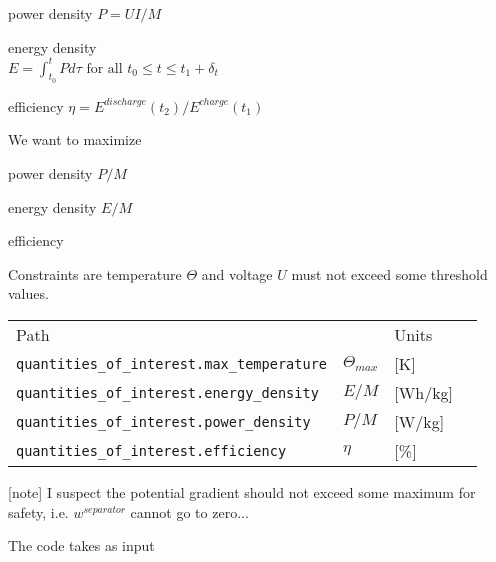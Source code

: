 \documentclass[10pt, oneside]{article}   	%
\begin{document}
power density $P=UI/M$

energy density \\
$E=\int_{t_0}^{t} P d\tau \text{\ for\ all\ } t_0 \leq t \leq t_1+\delta_t$



efficiency $\eta=E^{discharge}(t_2)/E^{charge}(t_1)$

We want to maximize 

power density $P/M$

energy density $E/M$

efficiency

Constraints are 
temperature $\Theta$ and voltage $U$ must not exceed some threshold values.

{\footnotesize
\begin{tabular}{llll}
Path                      &     & Units \\
\texttt{quantities\_of\_interest.max\_temperature} & $\Theta_{max}$ & [K] \\
\texttt{quantities\_of\_interest.energy\_density}  & $E/M$          & [Wh/kg] \\
\texttt{quantities\_of\_interest.power\_density}   & $P/M$          & [W/kg] \\
\texttt{quantities\_of\_interest.efficiency}       & $\eta$         & [\%] \\
\end{tabular}
}


[note] 
I suspect the potential gradient should not exceed some maximum for safety,
i.e. $w^{separator}$ cannot go to zero...

The code takes as input
\end{document}
